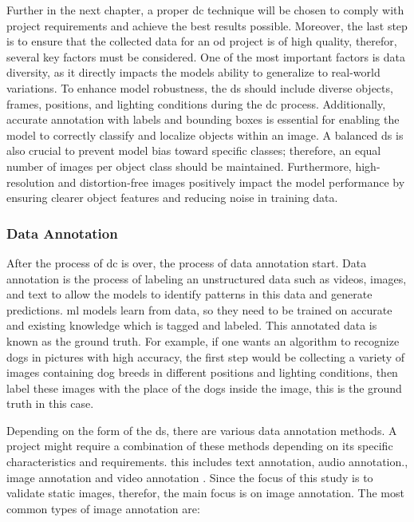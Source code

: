 Further in the next chapter, a proper \gls{dc} technique will be chosen to comply with project requirements and achieve the best results possible. Moreover, the last step is to ensure that the collected data for an \gls{od} project is of high quality, therefor, several key factors must be considered. One of the most important factors is data diversity, as it directly impacts the models ability to generalize to real-world variations. To enhance model robustness, the \gls{ds} should include diverse objects, frames, positions, and lighting conditions during the \gls{dc} process. Additionally, accurate annotation with labels and bounding boxes is essential for enabling the model to correctly classify and localize objects within an image. A balanced \gls{ds} is also crucial to prevent model bias toward specific classes; therefore, an equal number of images per object class should be maintained. Furthermore, high-resolution and distortion-free images positively impact the model performance by ensuring clearer object features and reducing noise in training data. 

\subsubsection{Data Annotation}
After the process of \gls{dc} is over, the process of data annotation start. Data annotation is the process of labeling an unstructured data such as videos, images, and text to allow the models to identify patterns in this data and generate predictions. \gls{ml} models learn from data, so they need to be trained on accurate and existing knowledge which is tagged and labeled. This annotated data is known as the ground truth. For example, if one wants an algorithm to recognize dogs in pictures with high accuracy, the first step would be collecting a variety of images containing dog breeds in different positions and lighting conditions, then label these images with the place of the dogs inside the image, this is the ground truth in this case. 

Depending on the form of the \gls{ds}, there are various data annotation methods. A project might require a combination of these methods depending on its specific characteristics and requirements. this includes text annotation, audio annotation., image annotation and video annotation \cite{Annotation_Tech}. Since the focus of this study is to validate static images, therefor, the main focus is on image annotation. The most common types of image annotation are:


